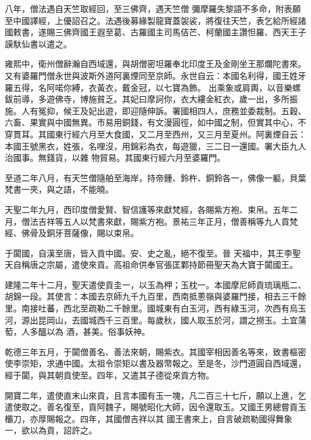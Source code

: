 \begin{pinyinscope}
 八年，僧法遇自天竺取經回，至三佛齊，遇天竺僧
 彌摩羅失黎語不多命，附表願至中國譯經，上優詔召之。法遇後募緣製龍寶蓋袈裟，將復往天竺，表乞給所經諸國敕書，遂賜三佛齊國王遐至葛、古羅國主司馬佶芒、柯蘭國主讚怛羅、西天王子謨馱仙書以遣之。



 雍熙中，衛州僧辭瀚自西域還，與胡僧密坦羅奉北印度王及金剛坐王那爛陀書來。又有婆羅門僧永世與波斯外道阿裏煙同至京師。永世自云：本國名利得，國王姓牙羅五得，名阿喏你縛，衣黃衣，戴金冠，以七寶為飾。
 出乘象或肩輿，以音樂螺鈸前導，多遊佛寺，博施貧乏。其妃曰摩訶你，衣大縷金紅衣，歲一出，多所振施。人有冤抑，候王及妃出遊，即迎隨伸訴。署國相四人，庶務並委裁制。五穀、六畜、果實與中國無異。市易用銅錢，有文漫圓徑，如中國之制，但實其中心，不穿貫耳。其國東行經六月至大食國，又二月至西州，又三月至夏州。阿裏煙自云：本國王號黑衣，姓張，名哩沒，用錦彩為衣，每遊獵，三二日一還國。署大臣九人治國事。無錢貨，以雜
 物貿易。其國東行經六月至婆羅門。



 至道二年八月，有天竺僧隨舶至海岸，持帝鍾、鈴杵、銅鈴各一，佛像一軀，貝葉梵書一夾，與之語，不能曉。



 天聖二年九月，西印度僧愛賢、智信護等來獻梵經，各賜紫方袍、束帛。五年二月，僧法吉祥等五人以梵書來獻，賜紫方袍。景祐三年正月，僧善稱等九人貢梵經、佛骨及銅牙菩薩像，賜以束帛。



 于闐國，自漢至唐，皆入貢中國。安、史之亂，絕不復至。晉
 天福中，其王李聖天自稱唐之宗屬，遣使來貢。高祖命供奉官張匡鄴持節冊聖天為大寶于闐國王。



 建隆二年十二月，聖天遣使貢圭一，以玉為柙；玉枕一。本國摩尼師貢琉璃瓶二、胡錦一段。其使言：本國去京師九千九百里，西南抵蔥嶺與婆羅門接，相去三千餘里。南接吐蕃，西北至疏勒二千餘里。國城東有白玉河，西有綠玉河，次西有烏玉河，源出昆岡山，去國城西千三百里。每歲秋，國人取玉於河，謂之撈玉。土宜蒲萄，人多醞以為
 酒，甚美。俗事妖神。



 乾德三年五月，于闐僧善名、善法來朝，賜紫衣。其國宰相因善名等來，致書樞密使李崇矩，求通中國。太祖令崇矩以書及器幣報之。至是冬，沙門道圓自西域還，經于闐，與其朝貢使至。四年，又遣其子德從來貢方物。



 開寶二年，遣使直末山來貢，且言本國有玉一塊，凡二百三十七斤，願以上進，乞遣使取之。善名復至，貢阿魏子，賜號昭化大師，因令還取玉。又國王男總嘗貢玉欛刀，亦厚賜報之。四年，其國僧吉祥以其
 國王書來上，自言破疏勒國得舞象一，欲以為貢，詔許之。




\end{pinyinscope}
